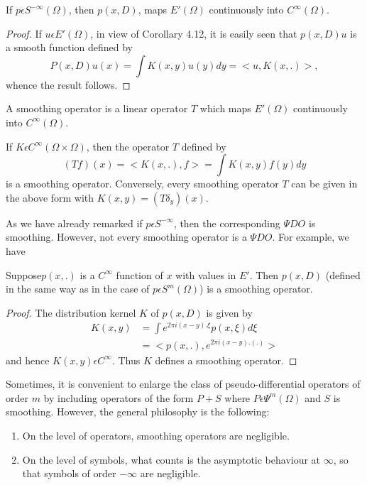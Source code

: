 \begin{coro}\label{chap4:sec2:coro4.13}
  If $p \epsilon S^{-\infty}(\Omega)$, then $p(x,D)$, maps
  $E'(\Omega)$ continuously into $C^\infty(\Omega)$. 
\end{coro}
\begin{proof}
  If $u \epsilon E'(\Omega)$, in view of Corollary 4.12, it is
  easily seen that \break $p(x,D)u$ is a smooth function defined by  
  $$ 
  P(x,D)u(x) = \int K(x,y) u (y) dy = <u, K (x,.) >,
  $$
  whence the result follows.
\end{proof}

\setcounter{defi}{13}
\begin{defi} \label{chap4:sec2:def4.14}
  A smoothing operator is a linear operator $T$ which maps
  $E'(\Omega)$ continuously into $C^\infty (\Omega)$. 
  
  If $K \epsilon C^\infty (\Omega \times \Omega)$, then the operator
  $T$ defined by  
  $$
  (Tf)(x)=< K(x,.), f> =\int K(x,y)f(y)dy
  $$
  is a smoothing operator.  Conversely,  every smoothing operator $T$
  can be given in the above form with $K(x,y)=(T \delta_y)(x)$. 
\end{defi}

As we have already remarked if $p \epsilon S^{-\infty}$, then the
corresponding $\Psi DO$ is smoothing. However, not every smoothing
operator is a $\Psi DO$. For example, we have 

\setcounter{prop}{14}
\begin{prop}\label{chap4:sec2:prop4.15}
  Suppose\pageoriginale $p(x,.)$ is a $C^\infty$ function of $x$ with values in
  $E'$. Then $p(x,D)$ (defined in the same way as in the case of $p
  \epsilon S^m(\Omega)$) is a smoothing operator. 
\end{prop}

\begin{proof}
  The distribution kernel $K$ of $p(x,D)$ is given by 
  \begin{align*}
    K(x,y) &= \int e^{2 \pi i(x-y).\xi}p(x,\xi)d \xi \\
    & = < p(x,.),e^{2 \pi i(x-y).(.)}>
  \end{align*}
  and hence $K (x,y) \epsilon C^\infty$. Thus $K$ defines a smoothing
  operator. 
\end{proof}

\setcounter{rem}{15}
\begin{rem}\label{chap4:sec2:rem4.16}
  Sometimes, it is convenient to enlarge the class of\break
  pseu\-do-differential operators of order $m$ by including operators of
  the form $P+S$ where $P \epsilon \Psi^m(\Omega)$ and $S$ is
  smoothing. However,  the general philosophy is the following:  
  \begin{enumerate}
  \item On the level of operators, smoothing operators are negligible.
  \item On the level of symbols, what counts is the asymptotic
    behaviour at $\infty$, so that symbols of order $-\infty$ are
    negligible. 
  \end{enumerate}
\end{rem}

